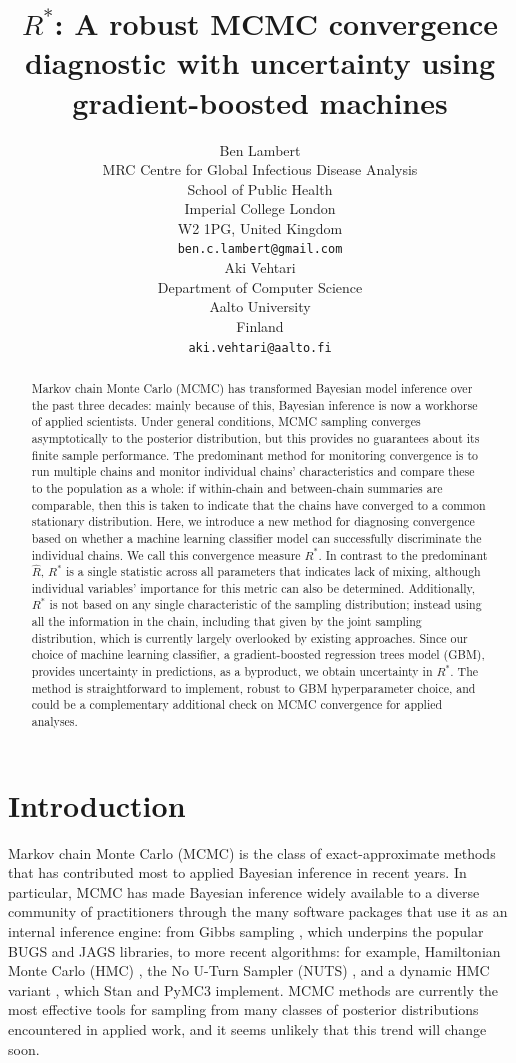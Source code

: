 \documentclass{article}
\title{$R^*$: A robust MCMC convergence diagnostic with uncertainty using gradient-boosted machines}
\author{%
	 Ben Lambert\\
	 MRC Centre for Global Infectious Disease Analysis\\
	 School of Public Health\\
	 Imperial College London\\
	 W2 1PG, United Kingdom\\
	 \texttt{ben.c.lambert@gmail.com} \\
	 \And
	 Aki Vehtari \\
	 Department of Computer Science\\
	 Aalto University\\
	 Finland\\
	 \texttt{aki.vehtari@aalto.fi}
}
\begin{document}

\maketitle

\begin{abstract}
  Markov chain Monte Carlo (MCMC) has transformed Bayesian model inference over the past three decades: mainly because of this, Bayesian inference is now a workhorse of applied scientists. Under general conditions, MCMC sampling converges asymptotically to the posterior distribution, but this provides no guarantees about its finite sample performance. The predominant method for monitoring convergence is to run multiple chains and monitor individual chains' characteristics and compare these to the population as a whole: if within-chain and between-chain summaries are comparable, then this is taken to indicate that the chains have converged to a common stationary distribution. Here, we introduce a new method for diagnosing convergence based on whether a machine learning classifier model can successfully discriminate the individual chains. We call this convergence measure $R^*$. In contrast to the predominant $\widehat{R}$, $R^*$ is a single statistic across all parameters that indicates lack of mixing, although individual variables' importance for this metric can also be determined. Additionally, $R^*$ is not based on any single characteristic of the sampling distribution; instead using all the information in the chain, including that given by the joint sampling distribution, which is currently largely overlooked by existing approaches. Since our choice of machine learning classifier, a gradient-boosted regression trees model (GBM), provides uncertainty in predictions, as a byproduct, we obtain uncertainty in $R^*$. The method is straightforward to implement, robust to GBM hyperparameter choice, and could be a complementary additional check on MCMC convergence for applied analyses.
\end{abstract}

\section{Introduction}
Markov chain Monte Carlo (MCMC) is the class of exact-approximate methods that has contributed most to applied Bayesian inference in recent years. In particular, MCMC has made Bayesian inference widely available to a diverse community of practitioners through the many software packages that use it as an internal inference engine: from Gibbs sampling \citep{geman1984stochastic}, which underpins the popular BUGS \citep{lunn2000winbugs} and JAGS \citep{plummer2003jags} libraries, to more recent algorithms: for example, Hamiltonian Monte Carlo (HMC) \citep{neal2011mcmc}, the No U-Turn Sampler (NUTS) \citep{hoffman2014no}, and a dynamic HMC variant \citep{betancourt2017conceptual}, which Stan \citep{carpenter2017stan} and PyMC3 \citep{salvatier2016probabilistic} implement. MCMC methods are currently the most effective tools for sampling from many classes of posterior distributions encountered in applied work, and it seems unlikely that this trend will change soon.
\end{document}
